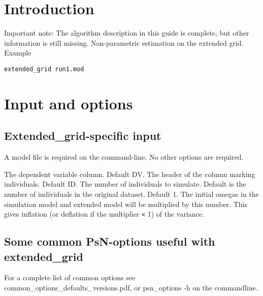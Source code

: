 



\maketitle


\section{Introduction}
Important note: The algorithm description in this guide is complete, but other information is still missing.
Non-parametric estimation on the extended grid. \cite{someone}
Example
\begin{verbatim}
extended_grid run1.mod
\end{verbatim}

\section{Input and options}

\subsection{Extended\_grid-specific input}

A model file is required on the command-line. No other options are required.

\begin{optionlist}
The dependent variable column. Default DV. 
\nextopt
{}
The header of the column marking individuals. Default ID. 
\nextopt
{}
The number of individuals to simulate. Default is the number of individuals in the original dataset. 
\nextopt
{}
Default 1. The initial omegas in the simulation model and extended model will be multiplied by this number. This gives inflation (or deflation if the multiplier \verb|<| 1) of the variance. 
\nextopt
\end{optionlist}


\subsection{Some common PsN-options useful with extended\_grid}

For a complete list of common options see common\_options\_defaults\_versions.pdf, or psn\_options -h on the commandline.

